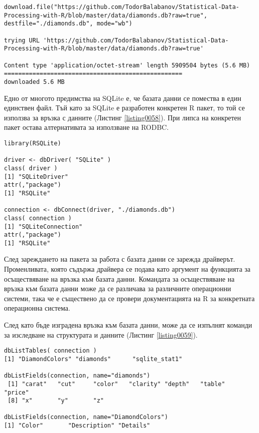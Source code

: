 \begin{lstlisting}[caption=Сваляне на файл с данни, label=listing0057]
download.file("https://github.com/TodorBalabanov/Statistical-Data-Processing-with-R/blob/master/data/diamonds.db?raw=true", destfile="./diamonds.db", mode="wb")

trying URL 'https://github.com/TodorBalabanov/Statistical-Data-Processing-with-R/blob/master/data/diamonds.db?raw=true'

Content type 'application/octet-stream' length 5909504 bytes (5.6 MB)
==================================================
downloaded 5.6 MB
\end{lstlisting}

Едно от многото предимства на SQLite е, че базата данни се помества в един единствен файл. Тъй като за SQLite е разработен конкретен R пакет, то той се използва за връзка с данните (Листинг \ref{listing0058}). При липса на конкретен пакет остава алтернативата за използване на RODBC.

\begin{lstlisting}[caption=Връзка към базата данни, label=listing0058]
library(RSQLite)

driver <- dbDriver( "SQLite" )
class( driver )
[1] "SQLiteDriver"
attr(,"package")
[1] "RSQLite"

connection <- dbConnect(driver, "./diamonds.db")
class( connection )
[1] "SQLiteConnection"
attr(,"package")
[1] "RSQLite"
\end{lstlisting}

След зареждането на пакета за работа с базата данни се зарежда драйверът. Променливата, която съдържа драйвера се подава като аргумент на функцията за осъществяване на връзка към базата данни. Командата за осъществяване на връзка към базата данни може да се различава за различните операционни системи, така че е съществено да се провери документацията на R за конкретната операционна система.

След като бъде изградена връзка към базата данни, може да се изпълнят команди за изследване на структурата и данните (Листинг \ref{listing0059}).

\begin{lstlisting}[caption=Изследване на базата данни, label=listing0059]
dbListTables( connection )
[1] "DiamondColors" "diamonds"      "sqlite_stat1" 

dbListFields(connection, name="diamonds")
 [1] "carat"   "cut"     "color"   "clarity" "depth"   "table"   "price"  
 [8] "x"       "y"       "z"

dbListFields(connection, name="DiamondColors")
[1] "Color"       "Description" "Details"
\end{lstlisting}

